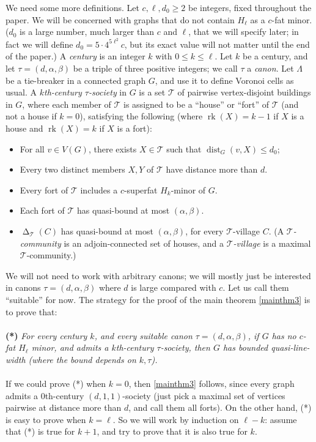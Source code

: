 \documentclass[titlepage,11pt]{article}
\newcommand{\dist}{\operatorname{dist}}
\newcommand{\voro}{\operatorname{\Delta}}
\newcommand{\rk}{\operatorname{rk}}
\newcommand{\mac}{\mathcal}
\begin{document}
	We need some more definitions. 
	Let $c,\ell,d_0\ge 2$ be integers, fixed throughout the paper. We will be concerned with graphs that do not contain $H_\ell$ as a $c$-fat
	minor. ($d_0$ is a large number, much larger than $c$ and $\ell$, that we will specify later; in fact we will define $d_0=5\cdot 4^{5\ell^2}c$, but its exact value will not matter until the end of the paper.)
	A {\em century} is an integer $k$ with  $0\le k\le \ell$. 
	Let $k$ be a century, and let $\tau = (d, \alpha,\beta)$ be a triple of
	three positive integers; we call $\tau$ a {\em canon}.
	Let $\Lambda$ be a tie-breaker in a connected graph $G$, and use it to define Voronoi cells as usual.
	A {\em $k$th-century $\tau$-society}
	in $G$ is a set $\mathcal{T}$ of pairwise vertex-disjoint buildings in $G$, where each member of $\mac T$ is assigned to be a ``house'' or ``fort'' of $\mac T$ (and not a house if $k=0$),
	satisfying the following (where $\rk(X)=k-1$ if $X$ is a house and $\rk(X)=k$ if $X$ is a fort):
	\begin{itemize}
		\item For all $v\in V(G)$, there exists $X\in \mathcal{T}$ such that $\dist_G(v,X)\le d_0$;
		\item Every two distinct members $X,Y$ of $\mac T$ have distance more than $d$.
		\item Every fort of $\mac T$ includes a $c$-superfat $H_k$-minor of $G$.
		\item Each fort of $\mac T$ has quasi-bound at most $(\alpha, \beta)$.
		\item $\voro_{\mac T}(C)$ has quasi-bound at most $(\alpha,\beta)$, for every $\mac T$-village $C$.
		(A {\em $\mac T$-community} is an adjoin-connected set of houses, and a {\em $\mac T$-village} is a maximal $\mac T$-community.)
	\end{itemize}
	
	We will not need to work with arbitrary canons; we will mostly just be interested in canons
	$\tau = (d, \alpha,\beta)$ where $d$ is large compared with $c$. Let us call them ``suitable'' for now.
	The strategy for the proof of the main theorem \ref{mainthm3} is to prove that:
	\\
	\\
	{\bf (*) }{\em For every century $k$, and every suitable canon $\tau=(d, \alpha,\beta)$, 
		if $G$ has no $c$-fat $H_\ell$ minor, and admits a $k$th-century $\tau$-society, then $G$ has bounded quasi-line-width (where the bound depends on 
		$k,\tau$).}
	\\
	\\
	If we could prove (*) when $k=0$, then \ref{mainthm3}
	follows, since every graph admits a $0$th-century $(d,1,1)$-society (just pick a maximal set of vertices 
	pairwise at distance more than $d$, and call them all forts). On the other hand, (*) is easy to prove when $k=\ell$. So we will work
	by induction on $\ell-k$: assume that (*) is true for $k+1$, and try to prove that it is also true for $k$.
	
\end{document}
